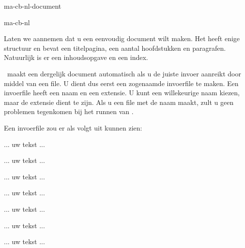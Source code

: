 \startonderdeel ma-cb-nl-document

\produkt ma-cb-nl



Laten we aannemen dat u een eenvoudig document wilt maken.
Het heeft enige structuur en bevat een titelpagina, een
aantal hoofdstukken en paragrafen. Natuurlijk is er een
inhoudsopgave en een index.

\CONTEXT\ maakt een dergelijk document automatisch als u de
juiste invoer aanreikt door middel van een file. U dient dus
eerst een zogenaamde invoerfile te maken. Een invoerfile
heeft een naam en een extensie. U kunt een willekeurige naam
kiezen, maar de extensie dient  te zijn. Als u een
file met de naam  maakt, zult u geen
problemen tegenkomen bij het runnen van \CONTEXT.

Een \paginareferentie[invoerfile] invoerfile zou er als
volgt uit kunnen zien:

\startbuffer
\starttekst

\startstandaardopmaak
{}
\stopstandaardopmaak

\volledigeinhoud


... uw tekst ...



... uw tekst ...



... uw tekst ...


... uw tekst ...


... uw tekst ...


... uw tekst ...


... uw tekst ...

\volledigeindex

\stoptekst
\stopbuffer

